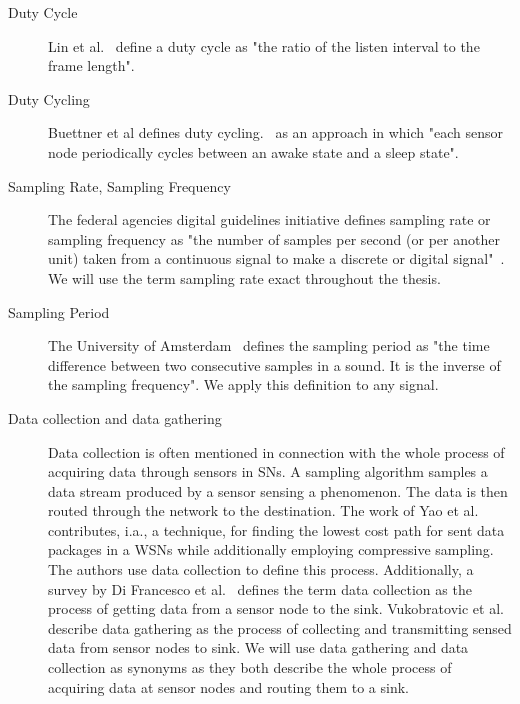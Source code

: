 \begin{description}
    \item[Duty Cycle]
        Lin et al.~\cite{lin2004medium} define a duty cycle as "the ratio of
        the listen interval to the frame length". 

    \item[Duty Cycling]
        Buettner et al defines duty cycling.~\cite{buettner2006x} as an
        approach in which "each sensor node periodically cycles between an
        awake state and a sleep state".

    \item[Sampling Rate, Sampling Frequency]
        The federal agencies digital guidelines initiative defines sampling
        rate or sampling frequency as "the number of samples per second (or per
        another unit) taken from a continuous signal to make a discrete or
        digital signal"~\cite{samplingrate}. We will use the term sampling rate
        exact throughout the thesis.
 
    \item[Sampling Period]
        The University of Amsterdam~\cite{samplingperiod} defines the sampling
        period as "the time difference between two consecutive samples in a
        sound. It is the inverse of the sampling frequency". We apply this
        definition to any signal.

    \item[Data collection and data gathering] 
        Data collection is often mentioned in connection with the whole process
        of acquiring data through sensors in \acp{SN}. A sampling algorithm
        samples a data stream produced by a sensor sensing a phenomenon. The
        data is then routed through the network to the destination. The work of
        Yao et al.~\cite{yao2015edal} contributes, i.a., a technique, for
        finding the lowest cost path for sent data packages in a \acp{WSN}
        while additionally employing compressive sampling. The authors use data
        collection to define this process. Additionally, a survey by Di
        Francesco et al.~\cite{di2011data} defines the term data collection as
        the process of getting data from a sensor node to the sink.
        Vukobratovic et al.~\cite{vukobratovic2010rateless, zhang2016data}
        describe data gathering as the process of collecting and transmitting
        sensed data from sensor nodes to sink. We will use data gathering and
        data collection as synonyms as they both describe the whole process of
        acquiring data at sensor nodes and routing them to a sink.


\end{description}
